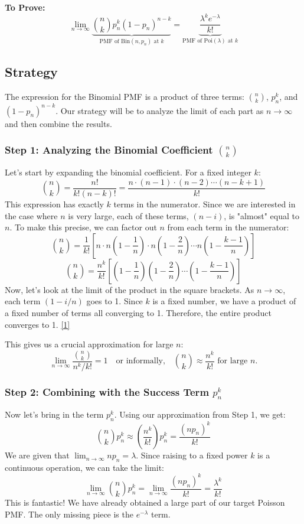 \documentclass[11pt,a4paper]{article}
\begin{document}
\vspace{5mm}
\noindent
\textbf{To Prove:}
\[
\lim_{n \to \infty} \underbrace{\binom{n}{k} p_n^k (1-p_n)^{n-k}}_{\text{PMF of Bin}(n, p_n) \text{ at } k} = \underbrace{\frac{\lambda^k e^{-\lambda}}{k!}}_{\text{PMF of Poi}(\lambda) \text{ at } k}
\]

\subsection{Strategy}
The expression for the Binomial PMF is a product of three terms: $\binom{n}{k}$, $p_n^k$, and $(1-p_n)^{n-k}$. Our strategy will be to analyze the limit of each part as $n \to \infty$ and then combine the results.

\subsubsection{Step 1: Analyzing the Binomial Coefficient $\binom{n}{k}$}
Let's start by expanding the binomial coefficient. For a fixed integer $k$:
\[
\binom{n}{k} = \frac{n!}{k!(n-k)!} = \frac{n \cdot (n-1) \cdot (n-2) \cdots (n-k+1)}{k!}
\]
This expression has exactly $k$ terms in the numerator. Since we are interested in the case where $n$ is very large, each of these terms, $(n-i)$, is "almost" equal to $n$. To make this precise, we can factor out $n$ from each term in the numerator:
\[
\binom{n}{k} = \frac{1}{k!} \left[ n \cdot n\left(1-\frac{1}{n}\right) \cdot n\left(1-\frac{2}{n}\right) \cdots n\left(1-\frac{k-1}{n}\right) \right]
\]
\[
\binom{n}{k} = \frac{n^k}{k!} \left[ \left(1-\frac{1}{n}\right) \left(1-\frac{2}{n}\right) \cdots \left(1-\frac{k-1}{n}\right) \right]
\]
Now, let's look at the limit of the product in the square brackets. As $n \to \infty$, each term $(1 - i/n)$ goes to 1. Since $k$ is a fixed number, we have a product of a fixed number of terms all converging to 1. Therefore, the entire product converges to 1. \hyperref[note:product_limit]{[1]}

This gives us a crucial approximation for large $n$:
\[
\lim_{n \to \infty} \frac{\binom{n}{k}}{n^k/k!} = 1 \quad \text{or informally,} \quad \binom{n}{k} \approx \frac{n^k}{k!} \text{ for large } n.
\]

\subsubsection{Step 2: Combining with the Success Term $p_n^k$}
Now let's bring in the term $p_n^k$. Using our approximation from Step 1, we get:
\[
\binom{n}{k} p_n^k \approx \left( \frac{n^k}{k!} \right) p_n^k = \frac{(n p_n)^k}{k!}
\]
We are given that $\lim_{n \to \infty} n p_n = \lambda$. Since raising to a fixed power $k$ is a continuous operation, we can take the limit:
\[
\lim_{n \to \infty} \binom{n}{k} p_n^k = \lim_{n \to \infty} \frac{(n p_n)^k}{k!} = \frac{\lambda^k}{k!}
\]
This is fantastic! We have already obtained a large part of our target Poisson PMF. The only missing piece is the $e^{-\lambda}$ term.
\end{document}
